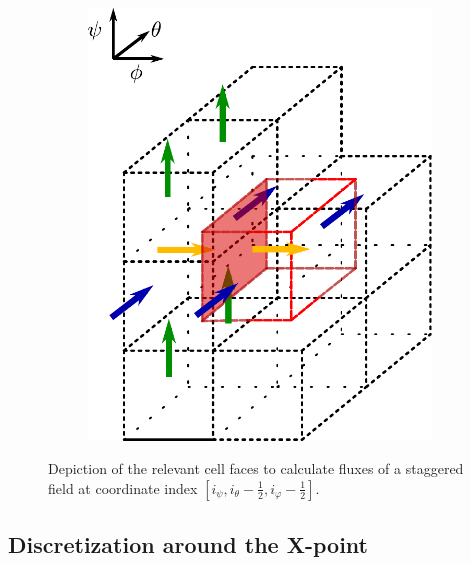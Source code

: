 \begin{figure}[H]
\begin{subfigure}[b]{0.24\textwidth}
		\includegraphics[width=1\textwidth]{schemes/BoundingBoxFluxPhiDiffPerp.pdf}
		\label{fig:StaggeredFluxPhi}
	\end{subfigure}
	
	\caption[Depiction of the relevant cell faces to calculate fluxes of a staggered field]{Depiction of the relevant cell faces to calculate fluxes of a staggered field at coordinate index $[i_\psi, i_\theta-\frac{1}{2}, i_\varphi-\frac{1}{2}]$.}
	\label{fig:StaggeredPerpendicularLaplancianCellSurfaces}
\end{figure}


\subsection{Discretization around the X-point}
\label{ssec:DiscretizationXPt}

